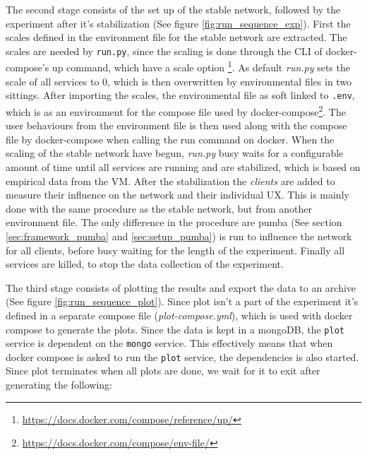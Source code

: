 

The second stage consists of the set up of the stable network, followed by the experiment after it's stabilization (See figure \ref{fig:run_sequence_exp}). First the scales defined in the environment file for the stable network are extracted. The scales are needed by \texttt{run.py}, since the scaling is done through the \ac{CLI} of docker-compose's up command, which have a scale option \footnote{\url{https://docs.docker.com/compose/reference/up/}}. As default \textit{run.py} sets the scale of all services to 0, which is then overwritten by environmental files in two sittings.
After importing the scales, the environmental file as soft linked to \texttt{.env}, which is as an environment for the compose file used by docker-compose\footnote{\url{https://docs.docker.com/compose/env-file/}}.
The user behaviours from the environment file is then used along with the compose file by docker-compose when calling the run command on docker.
When the scaling of the stable network have begun, \textit{run.py} busy waits for a configurable amount of time until all services are running and are stabilized, which is based on empirical data from the \acs{VM}.
After the stabilization the \textit{clients} are added to measure their influence on the network and their individual \acs{UX}. This is mainly done with the same procedure as the stable network, but from another environment file. The only difference in the procedure are pumba (See section \ref{sec:framework_pumba}
 and \ref{sec:setup_pumba}) is run to influence the network for all clients, before busy waiting for the length of the experiment.
Finally all services are killed, to stop the data collection of the experiment.



The third stage consists of plotting the results and export the data to an archive (See figure \ref{fig:run_sequence_plot}). Since plot isn't a part of the experiment it's defined in a separate compose file (\textit{plot-compose.yml}), which is used with docker compose to generate the plots. Since the data is kept in a mongoDB, the \texttt{plot} service is dependent on the \texttt{mongo} service. This effectively means that when docker compose is asked to run the \texttt{plot} service, the dependencies is also started. Since plot terminates when all plots are done, we wait for it to exit after generating the following:


